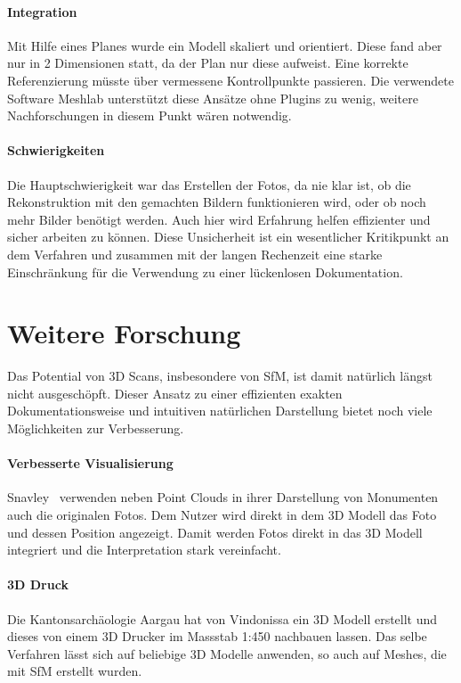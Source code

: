 		\paragraph{Integration}
			Mit Hilfe eines Planes wurde ein Modell skaliert und orientiert. Diese fand aber nur in 2 Dimensionen statt, da der Plan nur diese aufweist. Eine korrekte Referenzierung müsste über vermessene Kontrollpunkte passieren.
			Die verwendete Software Meshlab unterstützt diese Ansätze ohne Plugins zu wenig, weitere Nachforschungen in diesem Punkt wären notwendig.
			
		\paragraph{Schwierigkeiten}
			Die Hauptschwierigkeit war das Erstellen der Fotos, da nie klar ist, ob die Rekonstruktion mit den gemachten Bildern funktionieren wird, oder ob noch mehr Bilder benötigt werden. Auch hier wird Erfahrung helfen effizienter und sicher arbeiten zu können.
			Diese Unsicherheit ist ein wesentlicher Kritikpunkt an dem Verfahren und zusammen mit der langen Rechenzeit eine starke Einschränkung für die Verwendung zu einer lückenlosen Dokumentation.
				
	\section{Weitere Forschung}
		Das Potential von 3D Scans, insbesondere von SfM, ist damit natürlich längst nicht ausgeschöpft. Dieser Ansatz zu einer effizienten exakten Dokumentationsweise und intuitiven natürlichen Darstellung bietet noch viele Möglichkeiten zur Verbesserung.
		
		\paragraph{Verbesserte Visualisierung}
			Snavley \etal\ verwenden neben Point Clouds in ihrer Darstellung von Monumenten auch die originalen Fotos. Dem Nutzer wird direkt in dem 3D Modell das Foto und dessen Position angezeigt. Damit werden Fotos direkt in das 3D Modell integriert und die Interpretation stark vereinfacht.
			
		\paragraph{3D Druck}
			Die Kantonsarchäologie Aargau hat von Vindonissa ein 3D Modell erstellt und dieses von einem 3D Drucker im Massstab 1:450 nachbauen lassen. Das selbe Verfahren lässt sich auf beliebige 3D Modelle anwenden, so auch auf Meshes, die mit SfM erstellt wurden.
			

